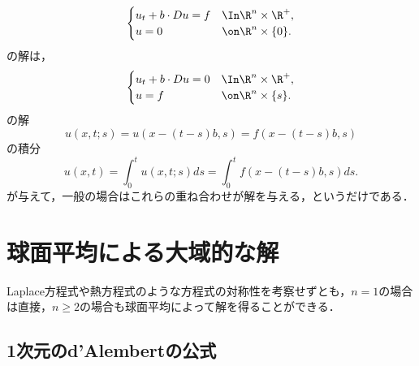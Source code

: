 \documentclass[uplatex,dvipdfmx]{jsreport}
\begin{document}
\begin{remarks}[Duhamelの原理]
    \[\begin{cases}
        u_t+b\cdot Du=f&\In\R^n\times\R^+,\\
        u=0&\on\R^n\times\{0\}.
    \end{cases}\]
    の解は，
    \[\begin{cases}
        u_t+b\cdot Du=0&\In\R^n\times\R^+,\\
        u=f&\on\R^n\times\{s\}.
    \end{cases}\]
    の解
    \[u(x,t;s)=u(x-(t-s)b,s)=f(x-(t-s)b,s)\]
    の積分
    \[u(x,t)=\int^t_0u(x,t;s)ds=\int^t_0f(x-(t-s)b,s)ds.\]
    が与えて，一般の場合はこれらの重ね合わせが解を与える，というだけである．
\end{remarks}

\section{球面平均による大域的な解}

\begin{tcolorbox}[colframe=ForestGreen, colback=ForestGreen!10!white,breakable,colbacktitle=ForestGreen!40!white,coltitle=black,fonttitle=\bfseries\sffamily,
title=]
    Laplace方程式や熱方程式のような方程式の対称性を考察せずとも，$n=1$の場合は直接，$n\ge2$の場合も球面平均によって解を得ることができる．
\end{tcolorbox}

\subsection{1次元のd'Alembertの公式}
\end{document}

